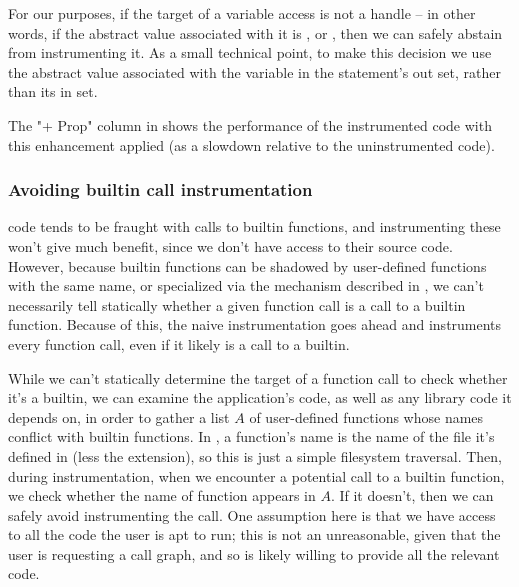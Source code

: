 For our purposes, if the target of a variable access is not a handle -- in
other words, if the abstract value associated with it is , 
or , then we can safely abstain from instrumenting it. As a small
technical point, to make this decision we use the abstract value associated
with the variable in the statement's out set, rather than its in set.

The "+ Prop" column in  shows the
performance of the instrumented code with this enhancement applied (as a
slowdown relative to the uninstrumented code).

\subsubsection{Avoiding builtin call instrumentation}

\matlab code tends to be fraught with calls to builtin functions, and
instrumenting these won't give much benefit, since we don't have access to
their source code. However, because \matlab builtin functions can be shadowed
by user-defined functions with the same name, or specialized via the mechanism
described in , we can't necessarily tell statically
whether a given function call is a call to a builtin function. Because of this,
the naive instrumentation goes ahead and instruments every function call, even
if it likely is a call to a builtin.

While we can't statically determine the target of a function call to check
whether it's a builtin, we can examine the application's code, as well as any
library code it depends on, in order to gather a list $A$ of user-defined
functions whose names conflict with builtin functions. In \matlab, a function's
name is the name of the file it's defined in (less the extension), so this is
just a simple filesystem traversal. Then, during instrumentation, when we
encounter a potential call to a builtin function, we check whether the name of
function appears in $A$. If it doesn't, then we can safely avoid instrumenting
the call. One assumption here is that we have access to all the code the user
is apt to run; this is not an unreasonable, given that the user is requesting a
call graph, and so is likely willing to provide all the relevant code.


